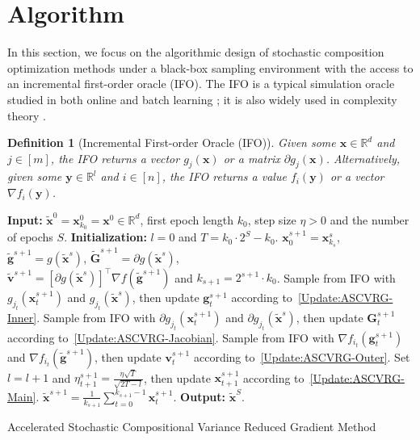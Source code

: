 \documentclass[11pt]{article}
\newtheorem{definition}{Definition}[section]
\newcommand{\x}{\mathbf x}
\newcommand{\y}{\mathbf y}
\newcommand{\sv}{\mathbf v}
\newcommand{\g}{\mathbf g}
\newcommand{\G}{\mathbf G}
\newcommand{\br}{\mathbb{R}}
\begin{document}
\section{Algorithm}\label{sec:algorithm}
In this section, we focus on the algorithmic design of stochastic composition optimization methods under a black-box sampling environment with the access to an incremental first-order oracle (IFO). The IFO is a typical simulation oracle studied in both online and batch learning \cite{Shalev-2012-Online}; it is also widely used in complexity theory \cite{Agarwal-2015-Lower, Woodworth-2016-Tight}. 
\begin{definition}[Incremental First-order Oracle (IFO)]
Given some $\x\in\br^d$ and $j\in\left[m\right]$, the IFO returns a vector $g_j(\x)$ or a matrix $\partial g_j(\x)$. Alternatively, given some $\y\in\br^l$ and $i\in\left[n\right]$, the IFO returns a value $f_i(\y)$ or a vector $\nabla f_i(\y)$. 
\end{definition}
\begin{algorithm}[t]
\begin{algorithmic}
\STATE \textbf{Input:} $\tilde{\x}^0{=}\x_{k_0}^0{=}\x^0\in\br^d$, first epoch length $k_0$, step size $\eta>0$ and the number of epochs $S$. 
\STATE \textbf{Initialization:} $l=0$ and $T=k_0 \cdot 2^S-k_0$.  
\STATE $\x_0^{s+1}=\x_{k_s}^s$, $\tilde{\g}^{s+1}{=}g(\tilde{\x}^s)$, $\tilde{\G}^{s+1}{=}\partial g(\tilde{\x}^s)$,\\ $\tilde{\sv}^{s+1}{=}\left[\partial g(\tilde{\x}^s)\right]^\top\nabla f(\tilde{\g}^{s+1})$ and $k_{s+1}=2^{s+1}\cdot k_0$.
\STATE Sample from IFO with $g_{j_t}(\x_t^{s+1})$ and $g_{j_t}(\tilde{\x}^s)$, then update $\g_t^{s+1}$ according to~\eqref{Update:ASCVRG-Inner}. 
\STATE Sample from IFO with $\partial g_{j_t}(\x_t^{s+1})$ and $\partial g_{j_t}(\tilde{\x}^s)$, then update $\G_t^{s+1}$ according to~\eqref{Update:ASCVRG-Jacobian}. 
\STATE Sample from IFO with $\nabla f_{i_t}(\g_t^{s+1})$ and $\nabla f_{i_t}(\tilde{\g}^{s+1})$, then update $\sv_t^{s+1}$ according to~\eqref{Update:ASCVRG-Outer}. 
\STATE Set $l=l+1$ and $\eta_{t+1}^{s+1}=\frac{\eta\sqrt{T}}{\sqrt{2T-l}}$, then update $\x_{t+1}^{s+1}$ according to~\eqref{Update:ASCVRG-Main}. 
\ENDFOR
\STATE $\tilde{\x}^{s+1}=\frac{1}{k_{s+1}}\sum_{t=0}^{k_{s+1}-1} \x_t^{s+1}$. 
\ENDFOR
\STATE \textbf{Output:} $\tilde{\x}^S$. 
\end{algorithmic} \caption{Accelerated Stochastic Compositional Variance Reduced Gradient Method} \label{Algorithm:ASCVRG}
\end{algorithm}
\end{document}
